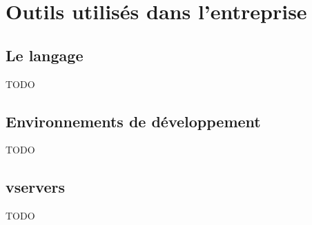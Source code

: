 \section{Outils utilisés dans l'entreprise}

\subsection{Le langage \aphp}

TODO

\subsection{Environnements de développement}

TODO

\subsection{vservers}

TODO


